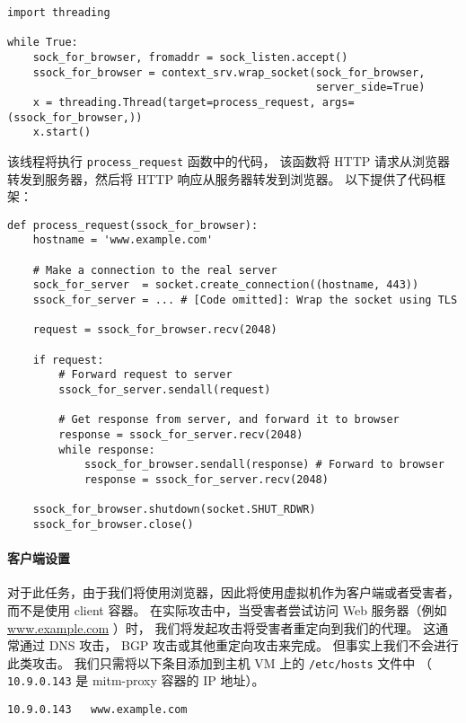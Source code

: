 \begin{lstlisting}
import threading

while True:
    sock_for_browser, fromaddr = sock_listen.accept()
    ssock_for_browser = context_srv.wrap_socket(sock_for_browser,
                                                server_side=True)
    x = threading.Thread(target=process_request, args=(ssock_for_browser,))
    x.start()
\end{lstlisting}


该线程将执行 \texttt{process\_request} 函数中的代码，
该函数将 HTTP 请求从浏览器转发到服务器，然后将 HTTP 响应从服务器转发到浏览器。
以下提供了代码框架：


\begin{lstlisting}
def process_request(ssock_for_browser):
    hostname = 'www.example.com'

    # Make a connection to the real server
    sock_for_server  = socket.create_connection((hostname, 443))
    ssock_for_server = ... # [Code omitted]: Wrap the socket using TLS

    request = ssock_for_browser.recv(2048)

    if request:
        # Forward request to server
        ssock_for_server.sendall(request)

        # Get response from server, and forward it to browser
        response = ssock_for_server.recv(2048)
        while response:
            ssock_for_browser.sendall(response) # Forward to browser
            response = ssock_for_server.recv(2048)

    ssock_for_browser.shutdown(socket.SHUT_RDWR)
    ssock_for_browser.close()
\end{lstlisting}


\paragraph{客户端设置}
对于此任务，由于我们将使用浏览器，因此将使用虚拟机作为客户端或者受害者，而不是使用 client 容器。
在实际攻击中，当受害者尝试访问 Web 服务器（例如 \url{www.example.com} ）时，
我们将发起攻击将受害者重定向到我们的代理。
这通常通过 DNS 攻击， BGP 攻击或其他重定向攻击来完成。
但事实上我们不会进行此类攻击。
我们只需将以下条目添加到主机 VM 上的 \texttt{/etc/hosts} 文件中
（ \texttt{10.9.0.143} 是 mitm-proxy 容器的 IP 地址）。

\begin{lstlisting}
10.9.0.143   www.example.com
\end{lstlisting}

